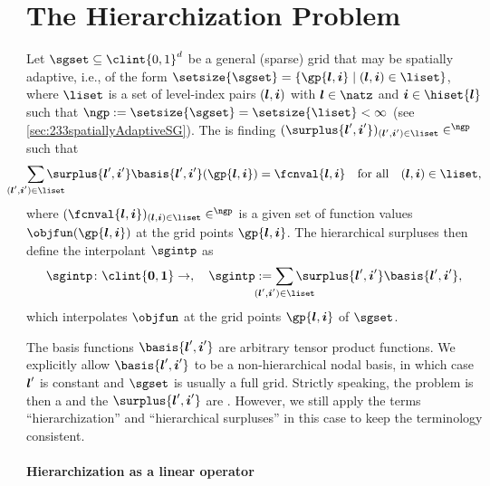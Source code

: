 \section{The Hierarchization Problem}
\label{sec:41problem}

Let $\sgset \subset \clint{0, 1}^d$ be a general (sparse) grid that
may be spatially adaptive, i.e.,
of the form $\setsize{\sgset} = \{\gp{\*l,\*i} \mid (\*l, \*i) \in \liset\}$,
where $\liset$ is a set of level-index pairs $({\boldsymbol{l}}, {\boldsymbol{i}})$ with $\*l \in \natz$
and $\*i \in \hiset{\*l}$ such that
$\ngp := \setsize{\sgset} = \setsize{\liset} < \infty$
(see \cref{sec:233spatiallyAdaptiveSG}).
The  is finding
$(\surplus{\*l',\*i'})_{(\*l',\*i') \in \liset} \in \real^{\ngp}$ such that
\begin{equation}
  \label{eq:hierarchizationProblem}
  \sum_{\mathclap{(\*l', \*i') \in \liset}} \surplus{\*l',\*i'}
  \basis{\*l',\*i'}(\gp{\*l,\*i}) = \fcnval{\*l,\*i}
  \quad\text{for all}\quad
  (\*l, \*i) \in \liset,
\end{equation}
where $(\fcnval{\*l,\*i})_{(\*l,\*i) \in \liset} \in \real^{\ngp}$ is a given set of
function values $\objfun(\gp{\*l,\*i})$ at the grid points $\gp{\*l,\*i}$.
The hierarchical surpluses then define the interpolant $\sgintp$ as
\begin{equation}
  \sgintp\colon \clint{\*0, \*1} \to \real,\quad
  \sgintp :=
  \sum_{\mathclap{(\*l', \*i') \in \liset}} \surplus{\*l',\*i'}
  \basis{\*l',\*i'},
\end{equation}
which interpolates $\objfun$ at the grid points $\gp{\*l,\*i}$ of $\sgset$.

The basis functions $\basis{\*l',\*i'}$ are
arbitrary tensor product functions.
We explicitly allow $\basis{\*l',\*i'}$ to be a non-hierarchical
nodal basis, in which case ${\boldsymbol{l}}'$ is constant and
$\sgset$ is usually a full grid.
Strictly speaking, the problem is then a 
and the $\surplus{\*l',\*i'}$ are .
However, we still apply the terms
``hierarchization'' and ``hierarchical surpluses'' in this case
to keep the terminology consistent.

\paragraph{Hierarchization as a linear operator}

